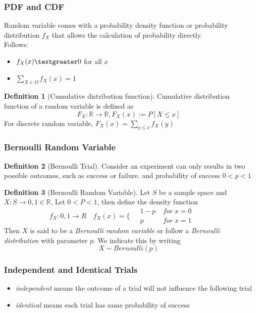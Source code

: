\documentclass{article}
\theoremstyle{definition}
\newtheorem{definition}{Definition}[subsection]
\begin{document}
\subsubsection{PDF and CDF}
Random variable comes with a probability density function or probability distribution $f_X$ that allows the calculation of probability directly.\\
Follows:
\begin{itemize}
    \item $f_X(x)\textgreater 0$ for all $x$
    \item $\sum_{X\in \Omega} f_X(x)=1$ 
\end{itemize}
\begin{definition}[Cumulative distribution function]
    Cumulative distribution function of a random variable is defined as 
    \begin{equation}
        F_X:\mathbb{R}\rightarrow \mathbb{R}, F_X(x):=P[X\leq x]
    \end{equation}
    For discrete random variable, $F_X(x) = \sum_{y\leq x} f_X(y) $
\end{definition}
\subsubsection{Bernoulli Random Variable}
\begin{definition}[Bernoulli Trial]    
Consider an experiment can only results in two possible outcomes, such as success or failure.
and probability of success $0<p<1$
\end{definition}
\begin{definition}[Bernoulli Random Variable]
    Let $S$ be a sample space and $X:S\rightarrow {0,1}\in \mathbb{R}$, Let $0<P<1$, then define the density function
    \begin{equation}
        f_X:{0,1}\rightarrow R \quad f_X(x)=\{
            \begin{aligned}
                &\;1-p\; &for\; x=0\qquad \\
                &\;p  & for\;x=1\qquad
            \end{aligned}
    \end{equation}
    Then $X$ is said to be a \emph{Bernoulli random variable} or follow a \emph{Bernoulli distribution} with parameter $p$.
    We indicate this by writing
    \begin{equation}
        X \sim Bernoulli(p)
    \end{equation}
\end{definition}
\subsubsection{Independent and Identical Trials}
\begin{itemize}
    \item \emph{independent} means the outcome of a trial will not influence the following trial
    \item \emph{identical} means each trial has same probability of success
\end{itemize}
\end{document}
